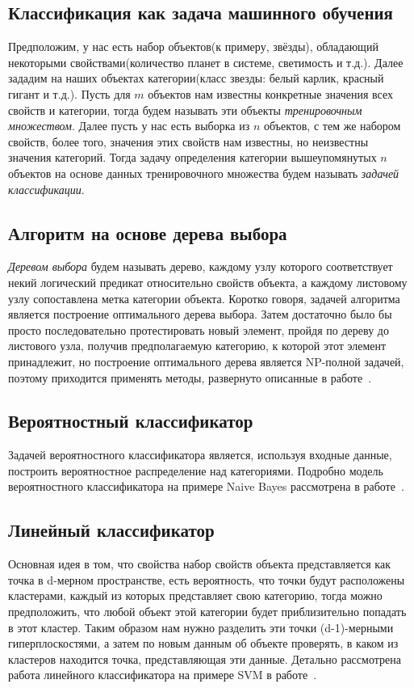 \documentclass{article}
\begin{document}
\subsection{Классификация как задача машинного обучения}
Предположим, у нас есть набор объектов(к примеру, звёзды), обладающий некоторыми свойствами(количество планет в системе, светимость и т.д.). Далее зададим на наших объектах категории(класс звезды: белый карлик, красный гигант и т.д.). Пусть для $m$ объектов нам известны конкретные значения всех свойств и категории, тогда будем называть эти объекты \emph{тренировочным множеством}. Далее пусть у нас есть выборка из $n$ объектов, с тем же набором свойств, более того, значения этих свойств нам известны, но неизвестны значения категорий. Тогда задачу определения категории вышеупомянутых $n$ объектов на основе данных тренировочного множества будем называть \emph{задачей классификации}.
\subsection{Алгоритм на основе дерева выбора}
\emph{Деревом выбора} будем называть дерево, каждому узлу которого соответствует некий логический предикат относительно свойств объекта, а каждому листовому узлу сопоставлена метка категории объекта. Коротко говоря, задачей алгоритма является построение оптимального дерева выбора. Затем достаточно было бы просто последовательно протестировать новый элемент, пройдя по дереву до листового узла, получив предполагаемую категорию, к которой этот элемент принадлежит, но построение оптимального дерева является NP-полной задачей, поэтому приходится применять методы, развернуто описанные в работе~\cite{desicionTree}.
\subsection{Вероятностный классификатор}
Задачей вероятностного классификатора является, используя входные данные, построить вероятностное распределение над категориями. Подробно модель вероятностного классификатора на примере Naive Bayes рассмотрена в работе~\cite{naiveBayes}.
\subsection{Линейный классификатор}
Основная идея в том, что свойства набор свойств объекта представляется как точка в d-мерном пространстве, есть вероятность, что точки будут расположены кластерами, каждый из которых представляет свою категорию, тогда можно предположить, что любой объект этой категории будет приблизительно попадать в этот кластер. Таким образом нам нужно разделить эти точки (d-1)-мерными гиперплоскостями, а затем по новым данным об объекте проверять, в каком из кластеров находится точка, представляющая эти данные. Детально рассмотрена работа линейного классификатора на примере SVM в работе~\cite{svm}.
\end{document}
